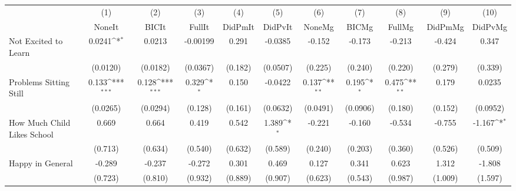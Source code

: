 {
\def\sym#1{\ifmmode^{#1}\else\(^{#1}\)\fi}
\begin{tabular}{l*{10}{c}}
\toprule
            &\multicolumn{1}{c}{(1)}&\multicolumn{1}{c}{(2)}&\multicolumn{1}{c}{(3)}&\multicolumn{1}{c}{(4)}&\multicolumn{1}{c}{(5)}&\multicolumn{1}{c}{(6)}&\multicolumn{1}{c}{(7)}&\multicolumn{1}{c}{(8)}&\multicolumn{1}{c}{(9)}&\multicolumn{1}{c}{(10)}\\
            &\multicolumn{1}{c}{NoneIt}&\multicolumn{1}{c}{BICIt}&\multicolumn{1}{c}{FullIt}&\multicolumn{1}{c}{DidPmIt}&\multicolumn{1}{c}{DidPvIt}&\multicolumn{1}{c}{NoneMg}&\multicolumn{1}{c}{BICMg}&\multicolumn{1}{c}{FullMg}&\multicolumn{1}{c}{DidPmMg}&\multicolumn{1}{c}{DidPvMg}\\
\midrule
Not Excited to Learn&      0.0241\sym{*}  &      0.0213         &    -0.00199         &       0.291         &     -0.0385         &      -0.152         &      -0.173         &      -0.213         &      -0.424         &       0.347         \\
            &    (0.0120)         &    (0.0182)         &    (0.0367)         &     (0.182)         &    (0.0507)         &     (0.225)         &     (0.240)         &     (0.220)         &     (0.279)         &     (0.339)         \\
\addlinespace
Problems Sitting Still&       0.133\sym{***}&       0.128\sym{***}&       0.329\sym{*}  &       0.150         &     -0.0422         &       0.137\sym{**} &       0.195\sym{*}  &       0.475\sym{**} &       0.179         &      0.0235         \\
            &    (0.0265)         &    (0.0294)         &     (0.128)         &     (0.161)         &    (0.0632)         &    (0.0491)         &    (0.0906)         &     (0.180)         &     (0.152)         &    (0.0952)         \\
\addlinespace
How Much Child Likes School&       0.669         &       0.664         &       0.419         &       0.542         &       1.389\sym{*}  &      -0.221         &      -0.160         &      -0.534         &      -0.755         &      -1.167\sym{*}  \\
            &     (0.713)         &     (0.634)         &     (0.540)         &     (0.632)         &     (0.589)         &     (0.240)         &     (0.203)         &     (0.360)         &     (0.526)         &     (0.509)         \\
\addlinespace
Happy in General&      -0.289         &      -0.237         &      -0.272         &       0.301         &       0.469         &       0.127         &       0.341         &       0.623         &       1.312         &      -1.808         \\
            &     (0.723)         &     (0.810)         &     (0.932)         &     (0.889)         &     (0.907)         &     (0.623)         &     (0.543)         &     (0.987)         &     (1.009)         &     (1.597)         \\
\bottomrule
\end{tabular}
}
